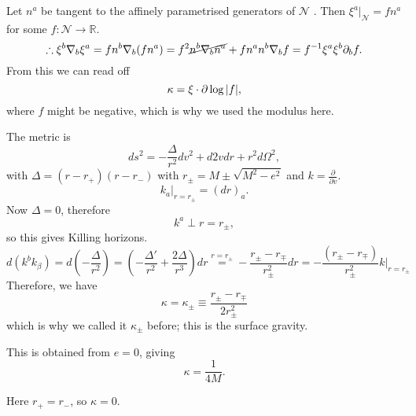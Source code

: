 Let $n^{a}$ be tangent to the affinely parametrised generators of $\mathcal{N}$ .
Then $\xi^{a} \rvert_\mathcal{N} = f n^{a}$ for some $f \colon \mathcal{N} \to \mathbb{R}$.
\begin{equation}
  \therefore \xi^{b} \nabla_b \xi^{a} = f n^{b} \nabla_b (f n^{a}) = f^2 \cancel{n^{b} \nabla_{b} n^{a}} + f n^{a} n^{b} \nabla_b f = f^{-1} \xi^{a} \xi^{b} \partial_{b} f.
\end{equation}
From this we can read off
\begin{equation}
  \kappa = \xi \cdot \partial \log \abs{f},
\end{equation}
where $f$ might be negative, which is why we used the modulus here.

\begin{example}[RN, ingoing EF]
  The metric is
  \begin{equation}
    ds^2 = - \frac{\Delta}{r^2} d v^2 + d 2 v dr + r^2 d\Omega^2,
  \end{equation}
  with $\Delta = (r - r_+) (r - r_-)$ with $r_\pm = M \pm \sqrt{M^2 - e^2}$ and $k = \frac{\partial }{\partial v}$.
  \begin{equation}
    k_a \rvert_{r = r_{\pm}} = (d r)_a.
  \end{equation}
  Now $\Delta = 0$, therefore
  \begin{equation}
    k^{a} \perp r = r_{\pm},
  \end{equation}
  so this gives Killing horizons.
  \begin{equation}
    d (k^{b} k_{\beta}) = d \left( -\frac{\Delta}{r^2} \right) = \left( - \frac{\Delta'}{r^2} + \frac{2 \Delta}{r^3} \right) d r \stackrel{r = r_\pm}{=} -\frac{r_\pm - r_\mp}{r_\pm^2} d r = -\frac{(r_\pm - r_\mp)}{r_\pm^2} k \rvert_{r = r_\pm}
  \end{equation}
  Therefore, we have
  \begin{equation}
    \kappa = \kappa_{\pm} \equiv \frac{r_\pm - r_\mp}{2 r_\pm^2}
  \end{equation}
  which is why we called it $\kappa_{\pm}$ before; this is the surface gravity.
\end{example}

\begin{example}[Schw.]
  This is obtained from $e = 0$, giving
  \begin{equation}
    \kappa = \frac{1}{4 M}.
  \end{equation}
\end{example}
\begin{example}[extreme RN]
  Here $r_+ = r_{-}$, so $\kappa = 0$.
\end{example}

